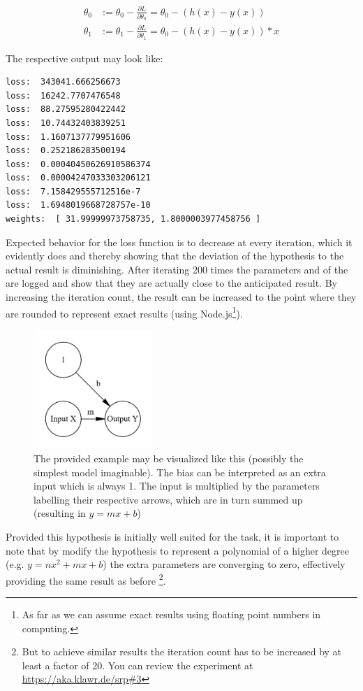 \begin{equation}
    \begin{split}
        \theta_{0} & := \theta_{0} - \frac{\partial L}{\partial \theta_{0}} =
        \theta_{0} - (h(x) - y(x))  \\
        \theta_{1} & := \theta_{1} - \frac{\partial L}{\partial \theta_{1}} =
        \theta_{0} - (h(x) - y(x)) * x
    \end{split}
    \label{eq:sgd_mse_here}
\end{equation}

The respective output may look like:
\begin{lstlisting}
loss:  343041.666256673
loss:  16242.7707476548
loss:  88.27595280422442
loss:  10.74432403839251
loss:  1.1607137779951606
loss:  0.252186283500194
loss:  0.00040450626910586374
loss:  0.00004247033303206121
loss:  7.158429555712516e-7
loss:  1.6948019668728757e-10
weights:  [ 31.99999973758735, 1.8000003977458756 ]
\end{lstlisting} 

Expected behavior for the loss function is to decrease at every iteration, which it evidently does and thereby showing that the deviation of the hypothesis to the actual result is diminishing.
After iterating 200 times the parameters  and  of the  are logged and show that they are actually close to the anticipated result.
By increasing the iteration count, the result can be increased to the point where they are rounded to represent exact results (using Node.js\footnote{ As far as we can assume exact results using floating point numbers in computing.}).

\begin{figure}
    \centering
    \caption{ The provided example may be visualized like this (possibly the        simplest model imaginable).
        The bias can be interpreted as an extra input which is always 1.
        The input is multiplied by the parameters labelling their respective arrows, which are in turn summed up (resulting in $y = mx + b$) }
    \includegraphics[width=0.4\textwidth]{images/1_simplest_nn.png}
\end{figure} 

Provided this hypothesis is initially well suited for the task, it is important to note that by modify the hypothesis to represent a polynomial of a higher degree (e.g. $y = nx^2 + mx + b$) the extra parameters are converging to zero, effectively providing the same result as before
\footnote{But to achieve similar results the iteration count has to be increased by at least a factor of 20.
You can review the experiment at \url{https://aka.klawr.de/srp\#3}}.

